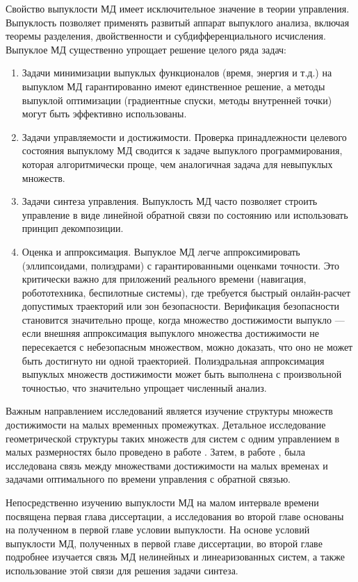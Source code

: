 \documentclass[../main.tex]{subfiles}
\begin{document}
Свойство выпуклости МД имеет исключительное значение в теории управления. 
Выпуклость позволяет применять развитый аппарат выпуклого анализа, включая теоремы разделения, двойственности и субдифференциального исчисления.
Выпуклое МД существенно упрощает решение целого ряда задач:
\begin{enumerate}
	\item Задачи минимизации выпуклых функционалов (время, энергия и т.д.) на выпуклом МД гарантированно имеют единственное решение, а методы выпуклой оптимизации (градиентные спуски, методы внутренней точки) могут быть эффективно использованы.
	\item Задачи управляемости и достижимости. 
	Проверка принадлежности целевого состояния выпуклому МД сводится к задаче выпуклого программирования, которая алгоритмически проще, чем аналогичная задача для невыпуклых множеств.
	\item Задачи синтеза управления. 
	Выпуклость МД часто позволяет строить управление в виде линейной обратной связи по состоянию или использовать принцип декомпозиции.
	\item Оценка и аппроксимация. 
	Выпуклое МД легче аппроксимировать (эллипсоидами, полиэдрами) с гарантированными оценками точности. 
	Это критически важно для приложений реального времени (навигация, робототехника, беспилотные системы), где требуется быстрый онлайн-расчет допустимых траекторий или зон безопасности. 
	Верификация безопасности становится значительно проще, когда множество достижимости выпукло — если внешняя аппроксимация выпуклого множества достижимости не пересекается с небезопасным множеством, можно доказать, что оно не может быть достигнуто ни одной траекторией. 
	Полиэдральная аппроксимация выпуклых множеств достижимости может быть выполнена с произвольной точностью, что значительно упрощает численный анализ.
\end{enumerate}

Важным направлением исследований является изучение структуры множеств достижимости на малых временных промежутках. 
Детальное исследование геометрической структуры таких множеств для систем с одним управлением в малых размерностях было проведено в работе \cite{Krener1989}. 
Затем, в работе \cite{Shattler1996}, была исследована связь между множествами достижимости на малых временах и задачами оптимального по времени управления с обратной связью.


Непосредственно изучению выпуклости МД на малом интервале времени посвящена первая глава диссертации, а исследования во второй главе основаны на полученном в первой главе условии выпуклости.
На основе условий выпуклости МД, полученных в первой главе диссертации, во второй главе подробнее изучается связь МД нелинейных и линеаризованных систем, а также использование этой связи для решения задачи синтеза. 
\end{document}
